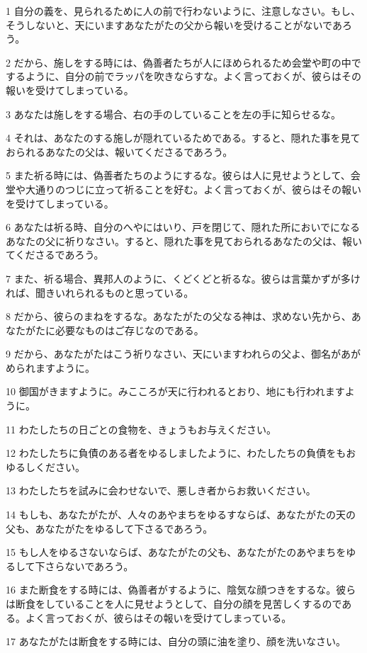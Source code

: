 \par 1 自分の義を、見られるために人の前で行わないように、注意しなさい。もし、そうしないと、天にいますあなたがたの父から報いを受けることがないであろう。
\par 2 だから、施しをする時には、偽善者たちが人にほめられるため会堂や町の中でするように、自分の前でラッパを吹きならすな。よく言っておくが、彼らはその報いを受けてしまっている。
\par 3 あなたは施しをする場合、右の手のしていることを左の手に知らせるな。
\par 4 それは、あなたのする施しが隠れているためである。すると、隠れた事を見ておられるあなたの父は、報いてくださるであろう。
\par 5 また祈る時には、偽善者たちのようにするな。彼らは人に見せようとして、会堂や大通りのつじに立って祈ることを好む。よく言っておくが、彼らはその報いを受けてしまっている。
\par 6 あなたは祈る時、自分のへやにはいり、戸を閉じて、隠れた所においでになるあなたの父に祈りなさい。すると、隠れた事を見ておられるあなたの父は、報いてくださるであろう。
\par 7 また、祈る場合、異邦人のように、くどくどと祈るな。彼らは言葉かずが多ければ、聞きいれられるものと思っている。
\par 8 だから、彼らのまねをするな。あなたがたの父なる神は、求めない先から、あなたがたに必要なものはご存じなのである。
\par 9 だから、あなたがたはこう祈りなさい、天にいますわれらの父よ、御名があがめられますように。
\par 10 御国がきますように。みこころが天に行われるとおり、地にも行われますように。
\par 11 わたしたちの日ごとの食物を、きょうもお与えください。
\par 12 わたしたちに負債のある者をゆるしましたように、わたしたちの負債をもおゆるしください。
\par 13 わたしたちを試みに会わせないで、悪しき者からお救いください。
\par 14 もしも、あなたがたが、人々のあやまちをゆるすならば、あなたがたの天の父も、あなたがたをゆるして下さるであろう。
\par 15 もし人をゆるさないならば、あなたがたの父も、あなたがたのあやまちをゆるして下さらないであろう。
\par 16 また断食をする時には、偽善者がするように、陰気な顔つきをするな。彼らは断食をしていることを人に見せようとして、自分の顔を見苦しくするのである。よく言っておくが、彼らはその報いを受けてしまっている。
\par 17 あなたがたは断食をする時には、自分の頭に油を塗り、顔を洗いなさい。

